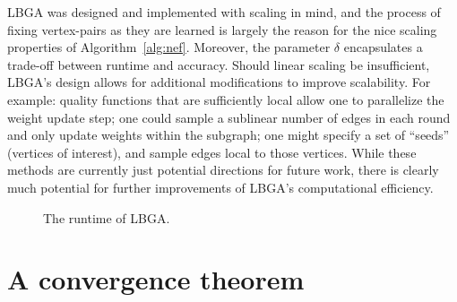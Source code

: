 \documentclass{IEEEtran}
\begin{document}
LBGA was designed and implemented with scaling in mind, and the process of
fixing vertex-pairs as they are learned is largely the reason for the nice
scaling properties of Algorithm~\ref{alg:nef}. Moreover, the parameter $\delta$
encapsulates a trade-off between runtime and accuracy. Should linear scaling be
insufficient, LBGA's design allows for additional modifications to improve
scalability.  For example: quality functions that are sufficiently local allow
one to parallelize the weight update step; one could sample a sublinear number
of edges in each round and only update weights within the subgraph; one might
specify a set of ``seeds'' (vertices of interest), and sample edges local to
those vertices. While these methods are currently just potential directions for
future work, there is clearly much potential for further improvements of LBGA's
computational efficiency.

\begin{figure}[bht]
\begin{centering}
\par\end{centering}
\caption{The runtime of LBGA.} 
\label{fig:scalability-analysis}
\end{figure}


\section{A convergence theorem}
\label{sec:convergence-theorem}
\end{document}
